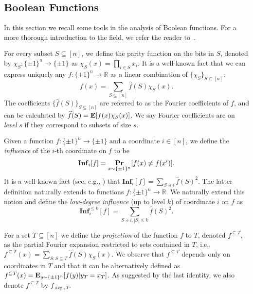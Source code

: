 \documentclass[10pt,a4paper]{article}
\theoremstyle{plain}
\theoremstyle{remark}
\theoremstyle{plain}
\providecommand{\R}{}
\renewcommand{\R}{\mathbb{R}}
\renewcommand{\Pr}{\mathop{\bf Pr\/}}
\providecommand{\E}{}
\renewcommand{\E}{\mathop{\bf E\/}}
\newcommand\Inf{{\mathbf{Inf}}}
\renewcommand{\hat}{\widehat}
\newcommand{\pmone}{\{\pm 1\}}
\newcommand{\avg}{\operatorname{avg}}
\newcommand{\BooleanHypercube}[1]{\{\pm 1\}^{#1}}
\begin{document}
\subsection{Boolean Functions}
In this section we recall some tools in the analysis of Boolean functions. For a more thorough introduction to the field, we refer the reader to~\cite{AOBFbook}. 

For every subset $S\subseteq[n]$, we define the parity function on the bits in $S$, denoted by $\chi_S: \BooleanHypercube{n} \to \BooleanHypercube{}$ as $\chi_S(x) = \prod_{i \in S}x_i$.  It is a well-known fact that we can express uniquely any $f: \BooleanHypercube{n} \to \R$ as a linear combination of $\{\chi_S\}_{S\subseteq[n]}$: 
$$f(x) = \sum_{S\subseteq[n]}\hat{f}(S)\chi_S(x).$$
The coefficients $\{\hat{f}(S)\}_{S\subseteq[n]}$ are referred to as the Fourier coefficients of $f$, and can be calculated by $\hat{f}(S) = \E[f(x)\chi_S(x)]$. We say Fourier coefficients are on \textit{level} $s$ if they correspond to subsets of size $s$.
%

Given a function $f:\pmone^n \to \pmone$ and a coordinate $i \in [n]$, we define the \emph{influence} of the  $i$-th coordinate on $f$ to be
$$
\Inf_i[f] = \Pr_{x\sim \pmone^n}[f(x) \neq f(x^i)].
$$
%
It is a well-known fact (see, e.g., \cite[Theorem~2.20]{AOBFbook}) that $\Inf_i[f] = \sum_{S \ni i} \hat f(S)^2$. The latter definition naturally extends to  functions $f: \pmone^n \to \R$. We naturally extend this notion and define the \emph{low-degree influence} (up to level $k$) of coordinate $i$ on $f$ as
$$
\Inf_i^{\leq k}[f] = \sum_{S \ni i, |S| \leq k} \hat f(S)^2.
$$
%

For a set $T \subseteq [n]$ we define the {\em projection} of the function $f$ to $T$, denoted $f^{\subseteq T}$, as the partial Fourier expansion restricted to sets contained in $T$, i.e., $f^{\subseteq T}(x) = \sum_{S: S \subseteq T} \hat{f}(S) \chi_S(x)$. We observe that $f^{\subseteq T}$ depends only on coordinates in $T$ and that it can be alternatively defined as $f^{\subseteq T}(x) =\E_{y\sim \pmone^n}[f(y)|y_T=x_T]$. As suggested by the last identity, we also denote $f^{\subseteq T}$ by $f_{\avg, T}$.
\end{document}
